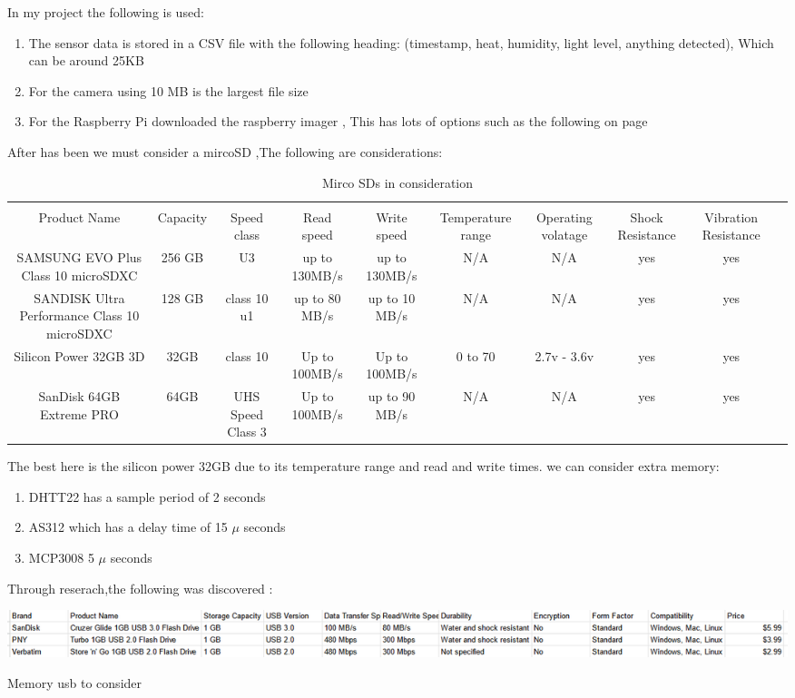 In my project the following is used:
\begin{enumerate}
	\item The sensor data  is stored in a  CSV file with the following heading: (timestamp, heat, humidity, light level, anything detected), Which can be around 25KB
	\item For the camera using 10 MB is the  largest file  size
	\item For the Raspberry Pi  downloaded  the raspberry imager , This has  lots of  options such as  the  following on page \pageref{pi os}
\end{enumerate}

After has been we must consider a  mircoSD ,The following are considerations:
\begin{table}[h!]
	\begin{tabular}{|c|c|c|c|c|c|c|c|c|c|}
		\hline \\
		Product Name & Capacity & Speed class & Read speed & Write speed & Temperature range & Operating volatage &Shock Resistance &Vibration Resistance \\
		\hline \hline
		SAMSUNG EVO Plus Class 10 microSDXC& 256 GB &U3&up to 130MB/s&up to 130MB/s&N/A&N/A&yes&yes \\
		SANDISK Ultra Performance Class 10 microSDXC&128 GB& class 10 u1&up to 80 MB/s&up to 10 MB/s&N/A&N/A&yes&yes \\
		Silicon Power 32GB 3D&32GB &class 10&Up to 100MB/s&Up to 100MB/s&0 to 70&2.7v - 3.6v&yes&yes \\
		SanDisk 64GB Extreme PRO&64GB&UHS Speed Class 3&Up to 100MB/s& up to 90 MB/s&N/A&N/A&yes&yes \\
		\hline
	\end{tabular}
	\caption{Mirco SDs in consideration}
	\label{mirco SDs in consirdation}
\end{table}

The best here is the silicon power 32GB due to its temperature range and read and write times.
we can consider extra memory: 
\begin{enumerate}
	\item DHTT22 has a sample period of  2 seconds
	\item AS312 which has a  delay time of 15 $\mu$ seconds
	\item MCP3008 5 $\mu$ seconds
\end{enumerate}

Through reserach,the following was discovered :
\begin{table}[h!]
	\centering
	\includegraphics[width=0.8\linewidth]{Images/memory_devices.png}
	\caption{Memory usb to consider}
	\label{Memory usb to consider}
\end{table}

